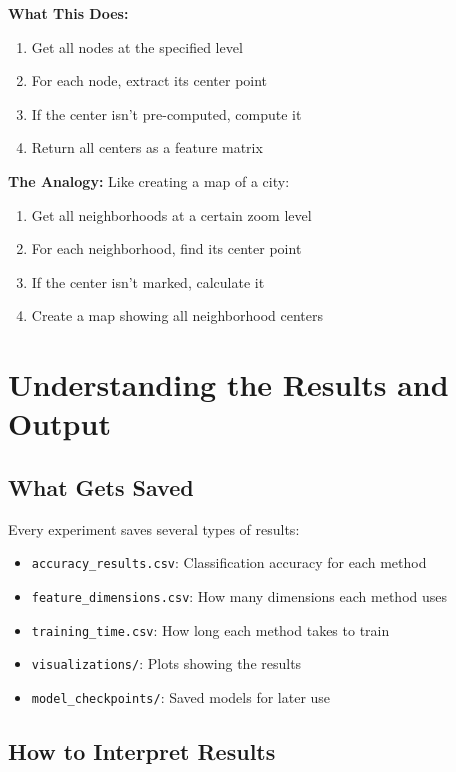 \documentclass[12pt]{article}
\begin{document}
\textbf{What This Does:}
\begin{enumerate}
    \item Get all nodes at the specified level
    \item For each node, extract its center point
    \item If the center isn't pre-computed, compute it
    \item Return all centers as a feature matrix
\end{enumerate}

\textbf{The Analogy:} Like creating a map of a city:
\begin{enumerate}
    \item Get all neighborhoods at a certain zoom level
    \item For each neighborhood, find its center point
    \item If the center isn't marked, calculate it
    \item Create a map showing all neighborhood centers
\end{enumerate}

\section{Understanding the Results and Output}

\subsection{What Gets Saved}

Every experiment saves several types of results:

\begin{itemize}
    \item \texttt{accuracy\_results.csv}: Classification accuracy for each method
    \item \texttt{feature\_dimensions.csv}: How many dimensions each method uses
    \item \texttt{training\_time.csv}: How long each method takes to train
    \item \texttt{visualizations/}: Plots showing the results
    \item \texttt{model\_checkpoints/}: Saved models for later use
\end{itemize}

\subsection{How to Interpret Results}
\end{document}
